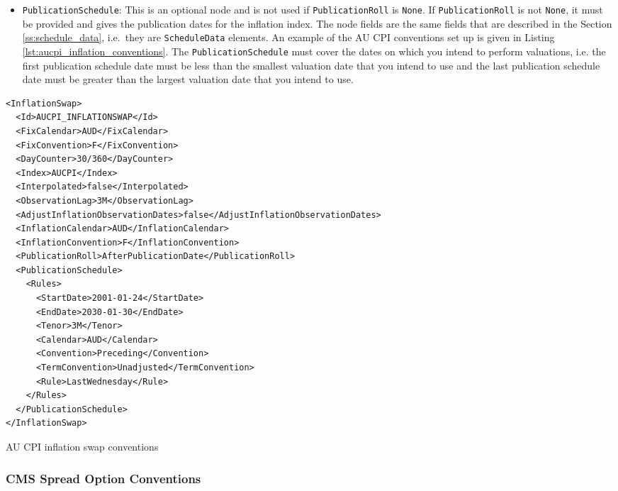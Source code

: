 \begin{itemize}
\item \lstinline!PublicationSchedule!:
This is an optional node and is not used if \lstinline!PublicationRoll! is \lstinline!None!. If \lstinline!PublicationRoll! is not \lstinline!None!, it must be provided and gives the publication dates for the inflation index. The node fields are the same fields that are described in the Section \ref{ss:schedule_data}, i.e.\ they are \lstinline!ScheduleData! elements. An example of the AU CPI conventions set up is given in Listing \ref{lst:aucpi_inflation_conventions}. The \lstinline!PublicationSchedule! must cover the dates on which you intend to perform valuations, i.e. the first publication schedule date must be less than the smallest valuation date that you intend to use and the last publication schedule date must be greater than the largest valuation date that you intend to use.

\end{itemize}

\begin{listing}[H]
\begin{verbatim}
<InflationSwap>
  <Id>AUCPI_INFLATIONSWAP</Id>
  <FixCalendar>AUD</FixCalendar>
  <FixConvention>F</FixConvention>
  <DayCounter>30/360</DayCounter>
  <Index>AUCPI</Index>
  <Interpolated>false</Interpolated>
  <ObservationLag>3M</ObservationLag>
  <AdjustInflationObservationDates>false</AdjustInflationObservationDates>
  <InflationCalendar>AUD</InflationCalendar>
  <InflationConvention>F</InflationConvention>
  <PublicationRoll>AfterPublicationDate</PublicationRoll>
  <PublicationSchedule>
    <Rules>
      <StartDate>2001-01-24</StartDate>
      <EndDate>2030-01-30</EndDate>
      <Tenor>3M</Tenor>
      <Calendar>AUD</Calendar>
      <Convention>Preceding</Convention>
      <TermConvention>Unadjusted</TermConvention>
      <Rule>LastWednesday</Rule>
    </Rules>
  </PublicationSchedule>
</InflationSwap>
\end{verbatim}
\caption{AU CPI inflation swap conventions}
\label{lst:aucpi_inflation_conventions}
\end{listing}

\subsubsection{CMS Spread Option Conventions}

